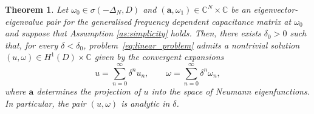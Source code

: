 \documentclass[a4paper,reqno,twoside]{amsart}
\numberwithin{equation}{section}
\newtheorem{theorem}{Theorem}[section]
\theoremstyle{definition}
\newcommand{\<}{\ensuremath \leq}
\renewcommand{\>}{\ensuremath \geq}
\begin{document}
\begin{theorem}\label{thm:approximation_convergence_linear}
    Let $\omega_0\in\sigma(-\Delta_N,D)$ and $(\mathbf{a}, \omega_1) \in \mathbb{C}^N \times \mathbb{C}$ be an eigenvector-eigenvalue pair for the generalised frequency dependent capacitance matrix at $\omega_0$ and suppose that Assumption \ref{as:simplicity} holds.
    Then, there exists $\delta_0 > 0$ such that, for every
    $\delta < \delta_0$, problem~\eqref{eq:linear_problem} admits
    a nontrivial solution $(u, \omega) \in H^1(D) \times \mathbb{C}$
    given by the convergent expansions
    \begin{equation}
        u = \sum_{n=0}^{\infty} \delta^{n} u_n,
        \qquad
        \omega = \sum_{n=0}^{\infty} \delta^{n} \omega_n,
    \end{equation}
    where $\mathbf{a}$ determines the projection of $u$ into the space of Neumann eigenfunctions. In particular, the pair $(u,\omega)$ is analytic in $\delta$.
\end{theorem}
\end{document}

